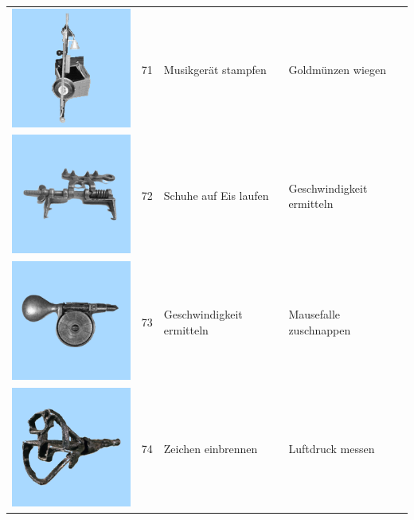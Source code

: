 \documentclass[
  english,
  man,floatsintext]{apa7}
\begin{document}
\begin{center}
\begin{ThreePartTable}
\begin{longtable}{llll}
\includegraphics[valign=c, scale=0.19]{../materials/unfamiliar/71.png} & 71 & Musikgerät stampfen & Goldmünzen wiegen\\
\includegraphics[valign=c, scale=0.19]{../materials/unfamiliar/72.png} & 72 & Schuhe auf Eis laufen & Geschwindigkeit ermitteln\\
\includegraphics[valign=c, scale=0.19]{../materials/unfamiliar/73.png} & 73 & Geschwindigkeit ermitteln & Mausefalle zuschnappen\\
\includegraphics[valign=c, scale=0.19]{../materials/unfamiliar/74.png} & 74 & Zeichen einbrennen & Luftdruck messen\\

\end{longtable}
\end{ThreePartTable}
\end{center}
\end{document}
